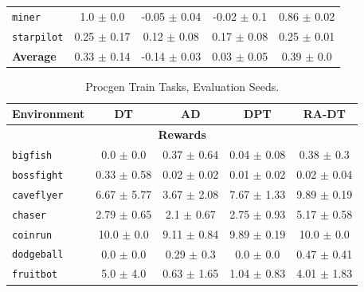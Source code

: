 \begin{table}[h]
\begin{tabular}{@{} l c c c c@{}}
    \texttt{miner}              &                    1.0 $\pm$ 0.0 &                  -0.05 $\pm$ 0.04 &                   -0.02 $\pm$ 0.1 &            0.86 $\pm$ 0.02 \\
    \texttt{starpilot}          &                  0.25 $\pm$ 0.17 &                   0.12 $\pm$ 0.08 &                   0.17 $\pm$ 0.08 &            0.25 $\pm$ 0.01 \\
    \textbf{Average}           &                       0.33 $\pm$ 0.14 &                  -0.14 $\pm$ 0.03 &                   0.03 $\pm$ 0.05 &             0.39 $\pm$ 0.0 \\
    \bottomrule
\end{tabular}
\label{tab:procgen-train-train}
\end{table}

\begin{table}[h]
    \centering
    \caption{Procgen Train Tasks, Evaluation Seeds.}
    \begin{tabular}{@{} l c c c c@{}}
    \toprule
    \textbf{Environment} & \textbf{DT} & \textbf{AD} & \textbf{DPT} & \textbf{RA-DT} \\ \midrule
    \multicolumn{5}{c}{\textbf{Rewards}} \\ 
    \texttt{bigfish}    &                    0.0 $\pm$ 0.0 &                   0.37 $\pm$ 0.64 &                   0.04 $\pm$ 0.08 &              0.38 $\pm$ 0.3 \\
    \texttt{bossfight}  &                  0.33 $\pm$ 0.58 &                   0.02 $\pm$ 0.02 &                   0.01 $\pm$ 0.02 &             0.02 $\pm$ 0.04 \\
    \texttt{caveflyer}  &                  6.67 $\pm$ 5.77 &                   3.67 $\pm$ 2.08 &                   7.67 $\pm$ 1.33 &             9.89 $\pm$ 0.19 \\
    \texttt{chaser}     &                  2.79 $\pm$ 0.65 &                    2.1 $\pm$ 0.67 &                   2.75 $\pm$ 0.93 &             5.17 $\pm$ 0.58 \\
    \texttt{coinrun}    &                   10.0 $\pm$ 0.0 &                   9.11 $\pm$ 0.84 &                   9.89 $\pm$ 0.19 &              10.0 $\pm$ 0.0 \\
    \texttt{dodgeball}  &                    0.0 $\pm$ 0.0 &                    0.29 $\pm$ 0.3 &                     0.0 $\pm$ 0.0 &             0.47 $\pm$ 0.41 \\
    \texttt{fruitbot}   &                    5.0 $\pm$ 4.0 &                   0.63 $\pm$ 1.65 &                   1.04 $\pm$ 0.83 &             4.01 $\pm$ 1.83 \\

\end{tabular}
\end{table}
